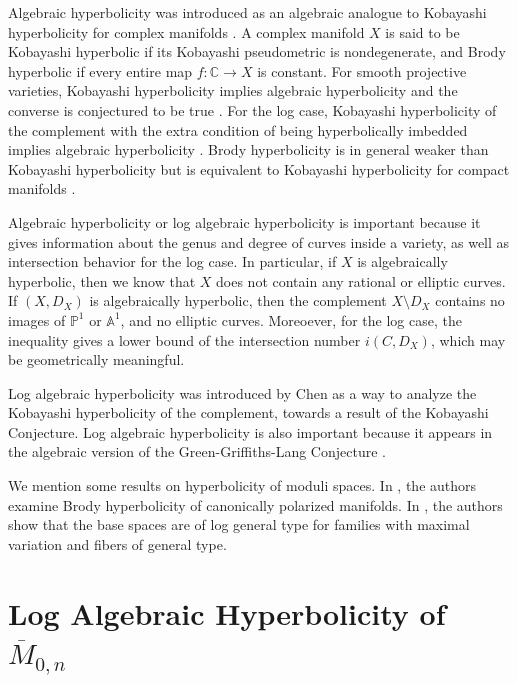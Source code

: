 \documentclass{amsart}
\theoremstyle{definition}
\theoremstyle{remark}
\begin{document}
Algebraic hyperbolicity was introduced as an algebraic analogue to Kobayashi hyperbolicity for complex manifolds \cite{Demailly1997}. A complex manifold \(X\) is said to be Kobayashi hyperbolic if its Kobayashi pseudometric is nondegenerate, and Brody hyperbolic if every entire map \(f:\mathbb{C}\to X\) is constant. For smooth projective varieties, Kobayashi hyperbolicity implies algebraic hyperbolicity and the converse is conjectured to be true \cite{Demailly1997}. For the log case, Kobayashi hyperbolicity of the complement with the extra condition of being hyperbolically imbedded implies algebraic hyperbolicity \cite[Theorem 5]{pacienza2006logarithmickobayashiconjecture}. Brody hyperbolicity is in general weaker than Kobayashi hyperbolicity but is equivalent to Kobayashi hyperbolicity for compact manifolds \cite{Brody1978}.

Algebraic hyperbolicity or log algebraic hyperbolicity is important because it gives information about the genus and degree of curves inside a variety, as well as intersection behavior for the log case. In particular, if $X$ is algebraically hyperbolic, then we know that $X$ does not contain any rational or elliptic curves. If $(X, D_X)$ is algebraically hyperbolic, then the complement \(X \setminus D_X\) contains no images of \(\mathbb{P}^1\) or \(\mathbb{A}^1\), and no elliptic curves. Moreoever, for the log case, the inequality gives a lower bound of the intersection number $i(C,D_X)$, which may be geometrically meaningful.


Log algebraic hyperbolicity was introduced by Chen \cite{chen2001algebraichyperbolicitylogvarieties} as a way to analyze the Kobayashi hyperbolicity of the complement, towards a result of the Kobayashi Conjecture. Log algebraic hyperbolicity is also important because it appears in the algebraic version of the Green-Griffiths-Lang Conjecture \cite{ascher2024algebraicgreengriffithslangconjecturecomplements}.

We mention some results on hyperbolicity of moduli spaces. In \cite{viehweg2003brodyhyperbolicitymodulispaces}, the authors examine Brody hyperbolicity of canonically polarized manifolds. In \cite{popa2016viehwegshyperbolicityconjecturefamilies}, the authors show that the base spaces are of log general type for families with maximal variation and fibers of general type.




\section{Log Algebraic Hyperbolicity of $\overline{M}_{0,n}$}
\end{document}
